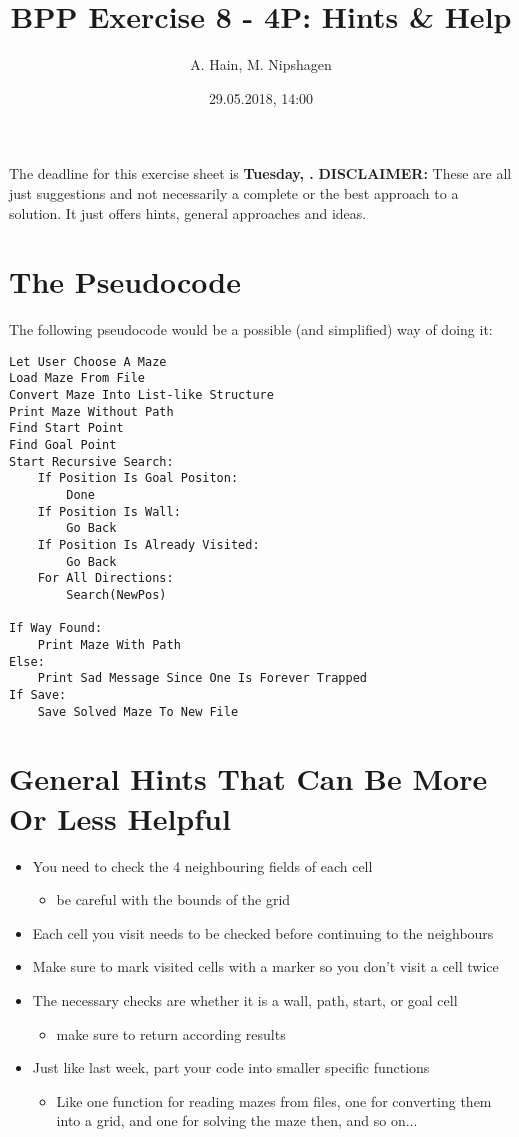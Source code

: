 

\title{BPP Exercise 8 - 4P: Hints \& Help}
\author{A. Hain, M. Nipshagen}
\date{29.05.2018, 14:00}

\makeatletter
\let\thetitle\@title
\let\theauthor\@author
\let\thedate\@date
\makeatother

\newcommand\itemsub[1]{
	\begin{itemize}
		\item #1
	\end{itemize}
}

\setcounter{secnumdepth}{0}


The deadline for this exercise sheet is \textbf{Tuesday, \thedate.}
\tableofcontents
\vspace{12pt}\noindent
\textbf{DISCLAIMER:} These are all just suggestions and not necessarily a complete
or the best approach to a solution. It just offers hints, general approaches
and ideas.
\pagebreak

\section{The Pseudocode}
The following pseudocode would be a possible (and simplified) way of doing it:
\begin{verbatim}
Let User Choose A Maze
Load Maze From File
Convert Maze Into List-like Structure
Print Maze Without Path
Find Start Point
Find Goal Point
Start Recursive Search:
    If Position Is Goal Positon:
        Done
    If Position Is Wall:
        Go Back
    If Position Is Already Visited:
        Go Back
    For All Directions:
        Search(NewPos)

If Way Found:
    Print Maze With Path
Else:
    Print Sad Message Since One Is Forever Trapped
If Save:
    Save Solved Maze To New File
\end{verbatim}
\pagebreak

\section{General Hints That Can Be More Or Less Helpful}
\begin{itemize}
    \item You need to check the 4 neighbouring fields of each cell
        \itemsub{be careful with the bounds of the grid}
    \item Each cell you visit needs to be checked before continuing to the neighbours
    \item Make sure to mark visited cells with a marker so you don't visit a cell twice
    \item The necessary checks are whether it is a wall, path, start, or goal cell
        \itemsub{make sure to return according results}
    \item Just like last week, part your code into smaller specific functions
        \itemsub{Like one function for reading mazes from files, one for converting them
        into a grid, and one for solving the maze then, and so on...}
\end{itemize}
\pagebreak

